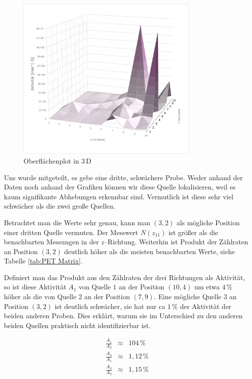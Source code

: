 \documentclass[12pt,a4paper]{scrartcl}
\numberwithin{equation}{section} %
\begin{document}
\begin{figure}[h!]
	\centering
	\includegraphics[width=0.8\textwidth]{../media/B3.4/PET_surface.jpg}
	\caption{Oberflächenplot in $3\,\mathrm D$}
	\label{abb:PET surface}
\end{figure}

Uns wurde mitgeteilt, es gebe eine dritte, schwächere Probe. Weder anhand der Daten noch anhand der Grafiken können wir diese Quelle lokalisieren, weil es kaum signifikante Abhebungen erkennbar sind. Vermutlich ist diese sehr viel schwächer als die zwei große Quellen.

Betrachtet man die Werte sehr genau, kann man $(3,2)$ als mögliche Position einer dritten Quelle vermuten. Der Messwert $N(z_{11})$ ist größer als die benachbarten Messungen in der $z$--Richtung. Weiterhin ist Produkt der Zählraten an Position $(3,2)$ deutlich höher als die meisten benachbarten Werte, siehe Tabelle \ref{tab:PET Matrix}.

Definiert man das Produkt aus den Zählraten der drei Richtungen als Aktivität, so ist diese Aktivität  $A_1$ von Quelle $1$ an der Position $(10,4)$ um etwa $4\,\%$ höher als die von Quelle $2$ an der Position $(7,9)$. Eine mögliche Quelle $3$ an Position $(3,2)$ ist deutlich schwächer, sie hat nur ca $1\,\%$ der Aktivität der beiden anderen Proben. Dies erklärt, warum sie im Unterschied zu den anderen beiden Quellen praktisch nicht identifizierbar ist.

\begin{eqnarray}
	\frac{A_1}{A_2} &\approx& 104\,\% \\
	\frac{A_3}{A_1} &\approx& 1,12\,\% \\
	\frac{A_3}{A_2} &\approx& 1,15\,\%
\end{eqnarray}
\end{document}
